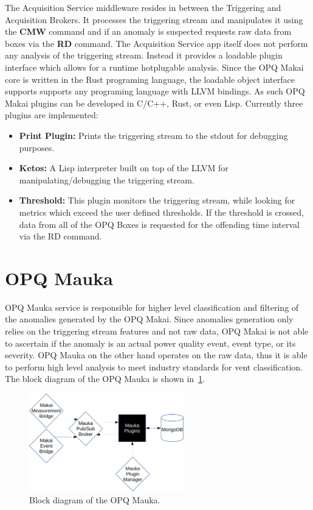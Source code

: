 The Acquisition Service middleware resides in between the Triggering and Acquisition Brokers.
It processes the triggering stream and manipulates it using the \textbf{CMW} command and if an anomaly is suspected requests raw data from boxes via the \textbf{RD} command.
The Acquisition Service app itself does not perform any analysis of the triggering stream.
Instead it provides a loadable plugin interface which allows for a runtime hotplugable analysis.
Since the OPQ Makai core is written in the Rust programing language, the loadable object interface supports supports any programing language with LLVM bindings.
As such OPQ Makai plugins can be developed in C/C++, Rust, or even Lisp.
Currently three plugins are implemented:

\begin{itemize}
\item{\textbf{Print Plugin:}} Prints the triggering stream to the stdout for debugging purposes. 
\item{\textbf{Ketos:}} A Lisp interpreter built on top of the LLVM for manipulating/debugging the triggering stream.
\item{\textbf{Threshold:}} This plugin monitors the triggering stream, while looking for metrics which exceed the user defined thresholds.
If the threshold is crossed, data from all of the OPQ Boxes is requested for the offending time interval via the RD command.
\end{itemize}

\section{OPQ Mauka}\label{sec:opq-mauka}
OPQ Mauka service is responsible for higher level classification and filtering of the anomalies generated by the OPQ Makai.
Since anomalies generation only
relies on the triggering stream features and not raw data, OPQ Makai is not able to ascertain if the anomaly is an actual power quality event, event type, or its severity.
OPQ Mauka on the other hand operates on the raw data, thus it is able to perform high level analysis to meet industry standards for vent classification.
The block diagram of the OPQ Mauka is shown in~\ref{fig:opq:11}.
\begin{figure}[h]
  \begin{center}
  \includegraphics[width=0.6\textwidth]{img/mauka.pdf}
  \end{center}
  \caption{Block diagram of the OPQ Mauka.}
  \label{fig:opq:11}
\end{figure}

